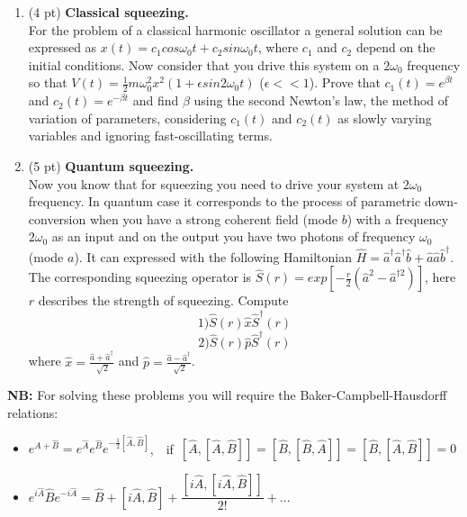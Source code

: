 \begin{hw}

	\begin{enumerate}
		\item (4 pt) {\bfseries Classical squeezing.}\\
		For the problem of a classical harmonic oscillator a general solution can be expressed as $x(t) = c_1 cos\omega_0t + c_2 sin \omega_0t$, where $c_1$ and $c_2$ depend on the  initial conditions. Now consider that you drive this system on a $2\omega_0$ frequency so that $ V(t) = \frac{1}{2}m\omega_0^2x^2\left(1 + \epsilon sin2\omega_0t \right)$ ($\epsilon << 1$). Prove that $c_1(t) = e^{\beta t}$ and $c_2(t) = e^{-\beta t}$ and find $\beta$ using the second Newton's law, the method of  variation of parameters, considering $c_1(t)$ and $c_2(t)$ as slowly varying variables and ignoring fast-oscillating terms.
		
		\item (5 pt) {\bfseries Quantum squeezing.}\\
		Now you know that for squeezing you need to drive your system at $2\omega_0$ frequency. In quantum case it corresponds to the process of parametric down-conversion when you have a strong coherent field (mode $b$) with a frequency $2 \omega_0$ as an input and on the output you have two photons of frequency $\omega_0$ (mode $a$). It can expressed with the following Hamiltonian $\hat H = \hat a^\dagger \hat a^\dagger \hat b + \hat a \hat a \hat b^\dagger$. The corresponding squeezing operator is $\hat S(r) = exp\left[-\frac{r}{2}\left( \hat a^2 - \hat a^{\dagger 2}\right)\right]$, here $r$ describes the strength of squeezing. Compute \\
		$$1) \hat S(r) \hat x \hat S^\dagger (r)$$
		$$2) \hat S(r) \hat p \hat S^\dagger (r)$$
		where $\hat x = \frac{\hat a + \hat a^\dagger}{\sqrt[]{2}}$ and $\hat p = \frac{\hat a - \hat a^\dagger}{\sqrt[]{2}}$.
	\end{enumerate}

	{\bf NB:} For solving these problems  you will require the Baker-Campbell-Hausdorff  relations:
	\begin{itemize}
		\item $e^{\hat A+\hat B}=e^{\hat A}e^{\hat B}e^{-\frac{1}{2}[\hat A, \hat B]}$,\ \  if\  $[\hat A,[\hat A,\hat B]]=[\hat B,[\hat B,\hat A]]=[\hat B,[\hat A,\hat B]]=0$
		\item $e^{i\hat A}\hat Be^{-i\hat A} = \hat B + [i\hat A,\hat B] + \dfrac{[i\hat A,[i\hat A,\hat B]]}{2!} + ...$
	\end{itemize}
\end{hw}